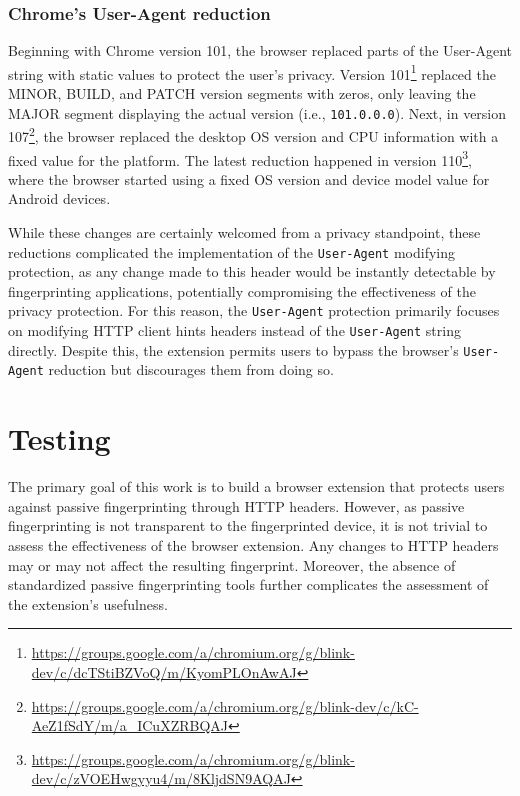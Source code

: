 \subsection{Chrome's User-Agent reduction}
\label{SubSection:UserAgentReduction}

Beginning with Chrome version 101, the browser replaced parts of the User-Agent string with static values to protect the user's privacy. Version 101\footnote{\url{https://groups.google.com/a/chromium.org/g/blink-dev/c/dcTStiBZVoQ/m/KyomPLOnAwAJ}} replaced the MINOR, BUILD, and PATCH version segments with zeros, only leaving the MAJOR segment displaying the actual version (i.e., \texttt{101.0.0.0}). Next, in version 107\footnote{\url{https://groups.google.com/a/chromium.org/g/blink-dev/c/kC-AeZ1fSdY/m/a_ICuXZRBQAJ}}, the browser replaced the desktop OS version and CPU information with a fixed value for the platform. The latest reduction happened in version 110\footnote{\url{https://groups.google.com/a/chromium.org/g/blink-dev/c/zVOEHwgyyu4/m/8KljdSN9AQAJ}}, where the browser started using a fixed OS version and device model value for Android devices.

While these changes are certainly welcomed from a privacy standpoint, these reductions complicated the implementation of the \texttt{User-Agent} modifying protection, as any change made to this header would be instantly detectable by fingerprinting applications, potentially compromising the effectiveness of the privacy protection. For this reason, the \texttt{User-Agent} protection primarily focuses on modifying HTTP client hints headers instead of the \texttt{User-Agent} string directly. Despite this, the extension permits users to bypass the browser's \texttt{User-Agent} reduction but discourages them from doing so.


\chapter{Testing}
\label{Chapter:Testing}

The primary goal of this work is to build a browser extension that protects users against passive fingerprinting through HTTP headers. However, as passive fingerprinting is not transparent to the fingerprinted device, it is not trivial to assess the effectiveness of the browser extension. Any changes to HTTP headers may or may not affect the resulting fingerprint. Moreover, the absence of standardized passive fingerprinting tools further complicates the assessment of the extension's usefulness.


